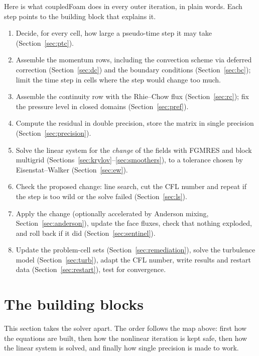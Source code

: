 \documentclass[11pt,a4paper]{article}
\begin{document}
Here is what coupledFoam does in every outer iteration, in plain words. Each
step points to the building block that explains it.
\begin{enumerate}
\item Decide, for every cell, how large a pseudo-time step it may take
  (Section~\ref{sec:ptc}).
\item Assemble the momentum rows, including the convection scheme via
  deferred correction (Section~\ref{sec:dc}) and the boundary conditions
  (Section~\ref{sec:bc}); limit the time step in cells where the step would
  change too much.
\item Assemble the continuity row with the Rhie--Chow flux
  (Section~\ref{sec:rc}); fix the pressure level in closed domains
  (Section~\ref{sec:pref}).
\item Compute the residual in double precision, store the matrix in single
  precision (Section~\ref{sec:precision}).
\item Solve the linear system for the \emph{change} of the fields with
  FGMRES and block multigrid (Sections~\ref{sec:krylov}--\ref{sec:smoothers}),
  to a tolerance chosen by Eisenstat--Walker (Section~\ref{sec:ew}).
\item Check the proposed change: line search, cut the CFL number and
  repeat if the step is too wild or the solve failed (Section~\ref{sec:ls}).
\item Apply the change (optionally accelerated by Anderson mixing,
  Section~\ref{sec:anderson}), update the face fluxes, check that nothing
  exploded, and roll back if it did (Section~\ref{sec:sentinel}).
\item Update the problem-cell sets (Section~\ref{sec:remediation}), solve
  the turbulence model (Section~\ref{sec:turb}), adapt the CFL number, write
  results and restart data (Section~\ref{sec:restart}), test for
  convergence.
\end{enumerate}

\section{The building blocks}\label{sec:blocks}

This section takes the solver apart. The order follows the map above:
first how the equations are built, then how the nonlinear iteration is kept
safe, then how the linear system is solved, and finally how single
precision is made to work.
\end{document}
